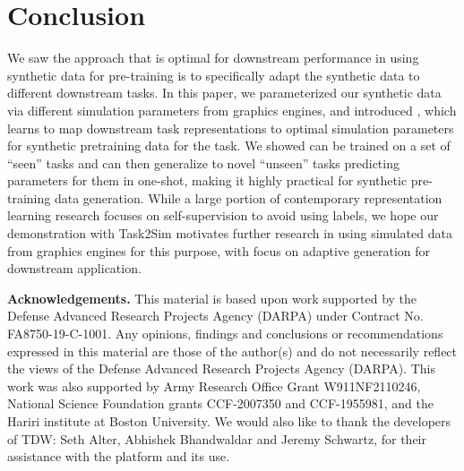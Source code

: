 





\vspace{-1mm}
\section{Conclusion} \label{sec:conclusion}
\vspace{-1mm}

We saw the approach that is optimal for downstream performance in using synthetic data for pre-training is to specifically adapt the synthetic data to different downstream tasks. In this paper, we parameterized our synthetic data via different simulation parameters from graphics engines, and introduced \ours, which learns to map downstream task representations to optimal simulation parameters for synthetic pretraining data for the task. We showed \ours can be trained on a set of ``seen'' tasks and can then generalize to novel ``unseen'' tasks predicting parameters for them in one-shot, making it highly practical for synthetic pre-training data generation. While a large portion of contemporary representation learning research focuses on self-supervision to avoid using labels, we hope our demonstration with Task2Sim motivates further research in using simulated data from graphics engines for this purpose, with focus on adaptive generation for downstream application.

 



\vspace{1mm}
\noindent\textbf{Acknowledgements.} This material is based upon work supported by the Defense Advanced Research Projects Agency (DARPA) under Contract No. FA8750-19-C-1001. Any opinions, findings and conclusions or recommendations expressed in this material are those of the author(s) and do not necessarily reflect the views of the Defense Advanced Research Projects Agency (DARPA). This work was also supported by Army Research Office Grant W911NF2110246, National Science Foundation grants CCF-2007350 and CCF-1955981, and the Hariri institute at Boston University. We would also like to thank the developers of TDW: Seth Alter, Abhishek Bhandwaldar and Jeremy Schwartz, for their assistance with the platform and its use.